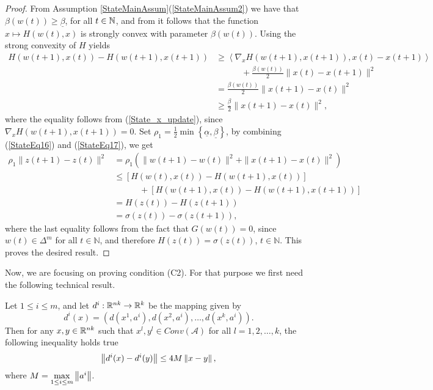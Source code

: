 \begin{proof}
From Assumption \ref{StateMainAssum}(\ref{StateMainAssum2}) we have that $\beta(w(t)) \geq \underline{\beta}$, for all $t \in \mathbb{N}$, and from  it follows that the function $x \mapsto H(w(t),x)$ is strongly convex with parameter $\beta(w(t))$. Using the strong convexity of $H$ yields
\begin{align}
	H(w(t+1),x(t))  - H(w(t+1),x(t+1)) &\geq \left\langle \nabla_x H(w(t+1),x(t+1)) , x(t)-x(t+1) \right\rangle \nonumber \\
	&\quad\quad\quad + \frac{\beta(w(t))}{2} \|x(t) - x(t+1)\|^2 \nonumber \\
	& = \frac{\beta(w(t))}{2} \|x(t+1) - x(t)\|^2  \nonumber \\
	& \geq \frac{\underline{\beta}}{2} \|x(t+1) - x(t)\|^2 , \label{StateEq17}
\end{align}
where the equality follows from (\ref{State_x_update}), since $\nabla_{x} H(w(t+1), x(t+1)) = 0$.
Set $\rho_1 = \frac{1}{2}\min\left\lbrace \underline{\alpha} , \underline{\beta} \right\rbrace$, by combining (\ref{StateEq16}) and (\ref{StateEq17}), we get
\begin{align*}
	\rho_1 \|z(t+1)- z(t)\|^2 
	&= \rho_1 \left( \|w(t+1) - w(t)\|^2 + \|x(t+1) - x(t)\|^2  \right) \\
	&\leq \left[ H(w(t),x(t)) - H(w(t+1),x(t)) \right] \\
	&\quad\quad\quad + \left[ H(w(t+1),x(t)) - H(w(t+1),x(t+1)) \right] \\
	&= H(z(t)) - H(z(t+1)) \\
	&= \sigma(z(t)) - \sigma(z(t+1)),
\end{align*}
where the last equality follows from the fact that $G(w(t)) = 0$, since $w(t) \in \Delta^m$ for all $t \in \mathbb{N}$, and therefore $H(z(t))=\sigma(z(t))$, $t \in \mathbb{N}$. This proves the desired result.
\end{proof}

Now, we are focusing on proving condition (C2). For that purpose we first need the following technical result.

\begin{lemma} \label{StateEq11}
Let $1 \leq i \leq m$, and let $d^i:\mathbb{R}^{nk} \rightarrow \mathbb{R}^k$ be the mapping given by 
\begin{equation*}
d^{i}(x) = (d(x^1,a^i), d(x^2,a^i), \ldots , d(x^k,a^i)).
\end{equation*}
Then for any $x,y \in \mathbb{R}^{nk}$ such that $x^l,y^l \in Conv\left(\mathcal{A}\right)$ for all $l=1,2,\ldots,k$, the following inequality holds true
\begin{equation*}
	\left\Vert {d^i(x) - d^i(y)} \right\Vert \leq 4M \left\Vert {x - y} \right\Vert,
\end{equation*}
where $M = \max\limits_{1 \leq i \leq m} \left\Vert {a^i} \right\Vert$.
\end{lemma}

